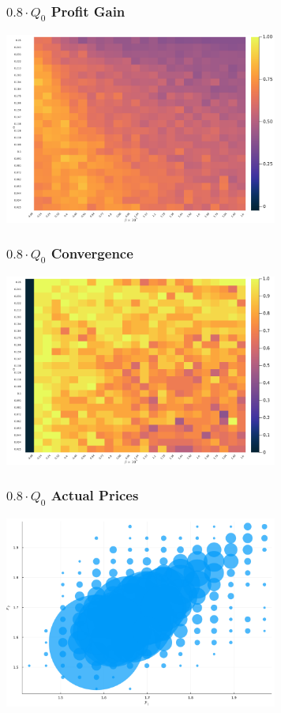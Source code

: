 \documentclass{beamer}
\begin{document}
	\begin{frame}\frametitle{$0.8 \cdot Q_0$ Profit Gain}
\begin{center}
	\includegraphics[width=9cm]{heatmap_profit_gain_small_0.8.png}
\end{center}
\end{frame}
\begin{frame}\frametitle{$0.8 \cdot Q_0$ Convergence}
\begin{center}
	\includegraphics[width=9cm]{heatmap_convergence_counts_small_0.8.png}
\end{center}
\end{frame}
\begin{frame}\frametitle{$0.8 \cdot Q_0$ Actual Prices}
\begin{center}
	\includegraphics[width=9cm]{scatter_plot_prices_small_0.8.png}
\end{center}
\end{frame}
\end{document}
